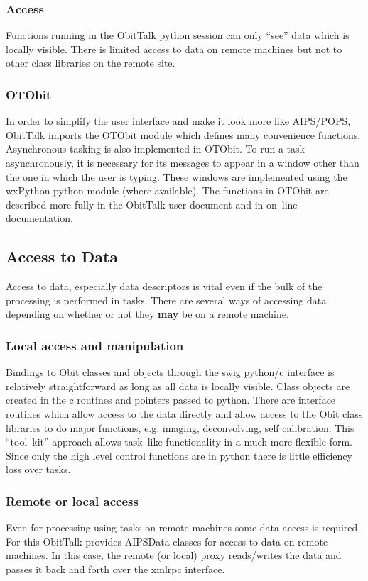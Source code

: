 \documentclass[11pt]{report}
\begin{document}
\subsubsection{Access}
Functions running in the ObitTalk python session can only ``see'' data
which is locally visible.
There is limited access to data on remote machines but not to other
class  libraries on the remote site.

\subsubsection{OTObit}
In order to simplify the user interface and make it look more like
AIPS/POPS, ObitTalk imports the OTObit module which defines many
convenience functions.
Asynchronous tasking is also implemented in OTObit.
To run a task asynchronously, it is necessary for its messages to
appear in a window other than the one in which the user is typing.
These windows are implemented using the wxPython python module (where
available). 
The functions in OTObit are described more fully in the ObitTalk user
document and in on--line documentation.

\subsection{Access to Data}
Access to data, especially data descriptors is vital even if the bulk
of the processing is performed in tasks.
There are several ways of accessing data depending on whether or not
they {\bf may} be on a remote machine.

\subsubsection{Local access and manipulation}
Bindings to Obit classes and objects through the swig python/c
interface is relatively straightforward as long as all data is locally
visible.
Class objects are created in the c routines and pointers passed to
python.
There are interface routines which allow access to the data directly
and allow access to the Obit class libraries to do major functions,
e.g. imaging, deconvolving, self calibration.
This ``tool--kit'' approach allows task--like functionality in a much
more flexible form.
Since only the high level control functions are in python there is
little efficiency loss over tasks.


\subsubsection{Remote or local access}
Even for processing using tasks on remote machines some data access is
required.
For this ObitTalk provides AIPSData classes for access to
data on remote machines.
In this case, the remote (or local) proxy reads/writes the data and
passes it back and forth over the xmlrpc interface.
\end{document}
